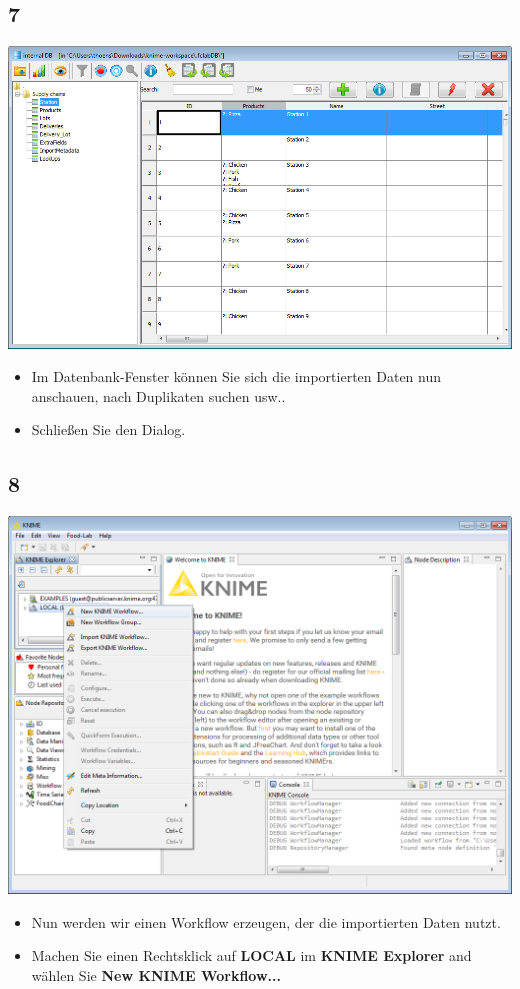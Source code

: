 \documentclass{beamer}
\begin{document}
\subsection{7}
\begin{frame}
	\begin{center}
  		\includegraphics[height=0.6\textheight]{7.png}
	\end{center}
	\begin{itemize}
		\item Im Datenbank-Fenster können Sie sich die importierten Daten nun anschauen, nach Duplikaten suchen usw..
		\item Schließen Sie den Dialog.
	\end{itemize}
\end{frame}

\subsection{8}
\begin{frame}
	\begin{center}
  		\includegraphics[height=0.6\textheight]{8.png}
	\end{center}
	\begin{itemize}
		\item Nun werden wir einen Workflow erzeugen, der die importierten Daten nutzt.
		\item Machen Sie einen Rechtsklick auf \textbf{LOCAL} im \textbf{KNIME Explorer} and wählen Sie \textbf{New KNIME Workflow...}
	\end{itemize}
\end{frame}
\end{document}

